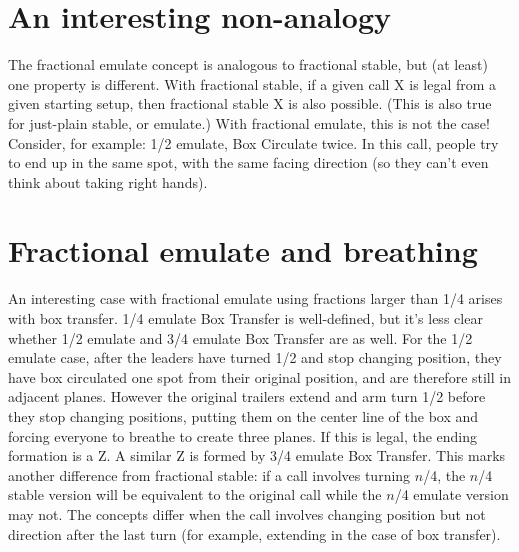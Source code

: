 \documentclass[11pt]{article}
\begin{document}
\section{An interesting non-analogy}

The fractional emulate concept is analogous to fractional stable,
but (at least) one property is different.
With fractional stable,
if a given call X is legal from a given starting setup,
then fractional stable X is also possible.
(This is also true for just-plain stable, or emulate.)
With fractional emulate, this is not the case!
Consider, for example: 1/2 emulate, Box Circulate twice.
In this call, people try to end up in the same spot,
with the same facing direction
(so they can't even think about taking right hands).


\section{Fractional emulate and breathing}

An interesting case with fractional emulate using fractions larger
than 1/4 arises with box transfer. 1/4 emulate Box Transfer is
well-defined, but it's less clear whether 1/2 emulate and 3/4 emulate
Box Transfer are as well. For the 1/2 emulate case, after the leaders
have turned 1/2 and stop changing position, they have box circulated
one spot from their original position, and are therefore still in
adjacent planes. However the original trailers extend and arm turn 1/2
before they stop changing positions, putting them on the center line
of the box and forcing everyone to breathe to create three planes. If
this is legal, the ending formation is a Z. A similar Z is formed by
3/4 emulate Box Transfer. This marks another difference from
fractional stable: if a call involves turning $n$/4, the $n$/4 stable
version will be equivalent to the original call while the $n$/4
emulate version may not. The concepts differ when the call involves
changing position but not direction after the last turn (for example,
extending in the case of box transfer).

\end{document}

